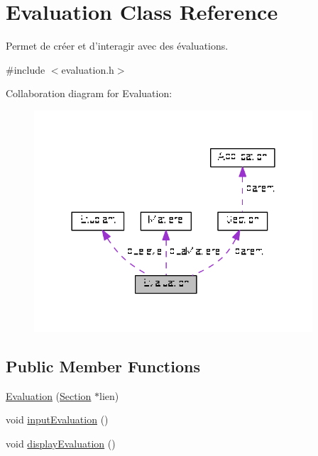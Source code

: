 \hypertarget{class_evaluation}{\section{Evaluation Class Reference}
\label{class_evaluation}
}


Permet de créer et d'interagir avec des évaluations.  




{\ttfamily \#include $<$evaluation.\+h$>$}



Collaboration diagram for Evaluation\+:
\nopagebreak
\begin{figure}[H]
\begin{center}
\leavevmode
\includegraphics[width=294pt]{class_evaluation__coll__graph}
\end{center}
\end{figure}
\subsection*{Public Member Functions}
\begin{DoxyCompactItemize}
\item 
\hyperlink{class_evaluation_afeed6d48b3009cfadb5d56acacd5af31}{Evaluation} (\hyperlink{class_section}{Section} $\ast$lien)
\item 
void \hyperlink{class_evaluation_a9f6db9e9282e6d1ecd00785db0538b4d}{input\+Evaluation} ()
\item 
void \hyperlink{class_evaluation_ab7114383e258c7d0c8b5e465e0939663}{display\+Evaluation} ()
\end{DoxyCompactItemize}
